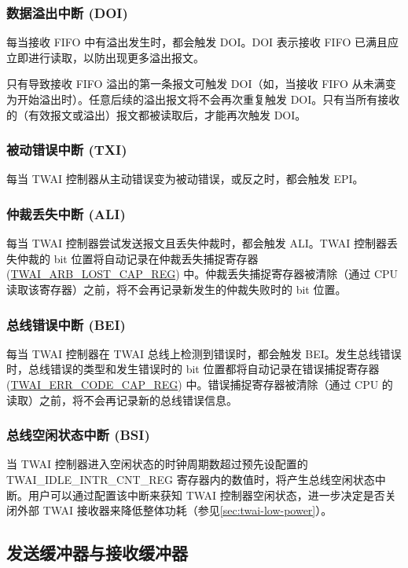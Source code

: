 \documentclass[main\_\_CN.tex]{subfiles}
\begin{document}
\subsubsection{数据溢出中断 (DOI)}
每当接收 FIFO 中有溢出发生时，都会触发 DOI。DOI 表示接收 FIFO 已满且应立即进行读取，以防出现更多溢出报文。

只有导致接收 FIFO 溢出的第一条报文可触发 DOI（如，当接收 FIFO 从未满变为开始溢出时）。任意后续的溢出报文将不会再次重复触发 DOI。只有当所有接收的（有效报文或溢出）报文都被读取后，才能再次触发 DOI。

\subsubsection{被动错误中断 (TXI)}
每当 TWAI 控制器从主动错误变为被动错误，或反之时，都会触发 EPI。

\subsubsection{仲裁丢失中断 (ALI)}
每当 TWAI 控制器尝试发送报文且丢失仲裁时，都会触发 ALI。TWAI 控制器丢失仲裁的 bit 位置将自动记录在仲裁丢失捕捉寄存器 (\hyperref[regdesc:TWAIARBLOSTCAPREG]{TWAI\_ARB\_LOST\_CAP\_REG}) 中。仲裁丢失捕捉寄存器被清除（通过 CPU 读取该寄存器）之前，将不会再记录新发生的仲裁失败时的 bit 位置。

\subsubsection{总线错误中断 (BEI)}
每当 TWAI 控制器在 TWAI 总线上检测到错误时，都会触发 BEI。发生总线错误时，总线错误的类型和发生错误时的 bit 位置都将自动记录在错误捕捉寄存器 (\hyperref[regdesc:TWAIERRCODECAPREG]{TWAI\_ERR\_CODE\_CAP\_REG}) 中。错误捕捉寄存器被清除（通过 CPU 的读取）之前，将不会再记录新的总线错误信息。

\subsubsection{总线空闲状态中断 (BSI)}
当 TWAI 控制器进入空闲状态的时钟周期数超过预先设配置的 TWAI\_IDLE\_INTR\_CNT\_REG 寄存器内的数值时，将产生总线空闲状态中断。用户可以通过配置该中断来获知 TWAI 控制器空闲状态，进一步决定是否关闭外部 TWAI 接收器来降低整体功耗（参见\ref{sec:twai-low-power}）。

\subsection{发送缓冲器与接收缓冲器}
\end{document}
